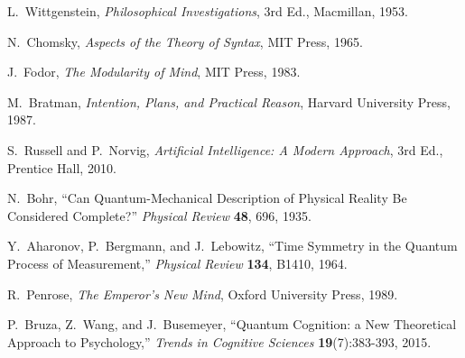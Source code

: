 \documentclass[11pt]{article}
\begin{document}
\begin{thebibliography}{99}

L.~Wittgenstein, \emph{Philosophical Investigations}, 3rd Ed., Macmillan, 1953.

N.~Chomsky, \emph{Aspects of the Theory of Syntax}, MIT Press, 1965.

J.~Fodor, \emph{The Modularity of Mind}, MIT Press, 1983.

M.~Bratman, \emph{Intention, Plans, and Practical Reason}, Harvard University Press, 1987.

S.~Russell and P.~Norvig, \emph{Artificial Intelligence: A Modern Approach}, 3rd Ed., Prentice Hall, 2010.

N.~Bohr, ``Can Quantum-Mechanical Description of Physical Reality Be Considered Complete?'' \emph{Physical Review} \textbf{48}, 696, 1935.

Y.~Aharonov, P.~Bergmann, and J.~Lebowitz, ``Time Symmetry in the Quantum Process of Measurement,'' \emph{Physical Review} \textbf{134}, B1410, 1964.

R.~Penrose, \emph{The Emperor's New Mind}, Oxford University Press, 1989.

P.~Bruza, Z.~Wang, and J.~Busemeyer, ``Quantum Cognition: a New Theoretical Approach to Psychology,'' \emph{Trends in Cognitive Sciences} \textbf{19}(7):383-393, 2015.

\end{thebibliography}
\end{document}
